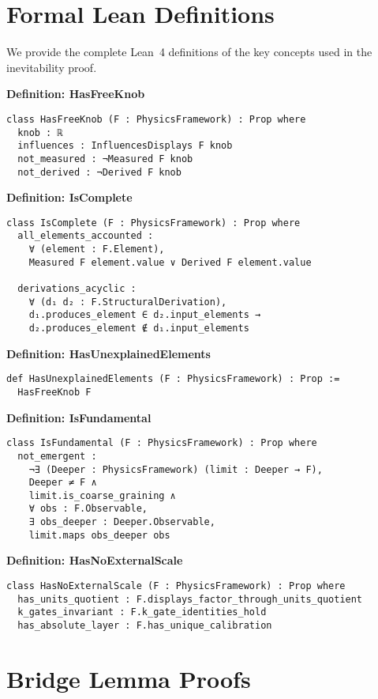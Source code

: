 \documentclass[12pt]{article}
\theoremstyle{remark}
\begin{document}
\begin{appendix}

\section{Formal Lean Definitions}\label{app:definitions}

We provide the complete Lean~4 definitions of the key concepts used in the inevitability proof.

\textbf{Definition: HasFreeKnob}
\begin{verbatim}
class HasFreeKnob (F : PhysicsFramework) : Prop where
  knob : ℝ
  influences : InfluencesDisplays F knob
  not_measured : ¬Measured F knob
  not_derived : ¬Derived F knob
\end{verbatim}

\textbf{Definition: IsComplete}
\begin{verbatim}
class IsComplete (F : PhysicsFramework) : Prop where
  all_elements_accounted :
    ∀ (element : F.Element),
    Measured F element.value ∨ Derived F element.value
  
  derivations_acyclic :
    ∀ (d₁ d₂ : F.StructuralDerivation),
    d₁.produces_element ∈ d₂.input_elements →
    d₂.produces_element ∉ d₁.input_elements
\end{verbatim}

\textbf{Definition: HasUnexplainedElements}
\begin{verbatim}
def HasUnexplainedElements (F : PhysicsFramework) : Prop :=
  HasFreeKnob F
\end{verbatim}

\textbf{Definition: IsFundamental}
\begin{verbatim}
class IsFundamental (F : PhysicsFramework) : Prop where
  not_emergent :
    ¬∃ (Deeper : PhysicsFramework) (limit : Deeper → F),
    Deeper ≠ F ∧
    limit.is_coarse_graining ∧
    ∀ obs : F.Observable,
    ∃ obs_deeper : Deeper.Observable,
    limit.maps obs_deeper obs
\end{verbatim}

\textbf{Definition: HasNoExternalScale}
\begin{verbatim}
class HasNoExternalScale (F : PhysicsFramework) : Prop where
  has_units_quotient : F.displays_factor_through_units_quotient
  k_gates_invariant : F.k_gate_identities_hold
  has_absolute_layer : F.has_unique_calibration
\end{verbatim}

\section{Bridge Lemma Proofs}\label{app:bridge-proofs}


\end{appendix}
\end{document}
